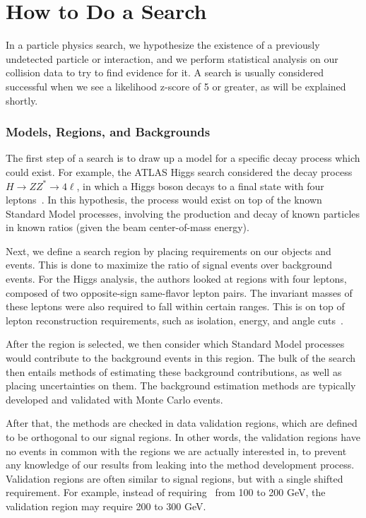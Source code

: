\chapter{How to Do a Search}

In a particle physics search, we hypothesize the existence of a previously undetected particle or interaction, and we perform statistical analysis on our collision data to try to find evidence for it. A search is usually considered successful when we see a likelihood z-score of 5 or greater, as will be explained shortly.

\subsection*{Models, Regions, and Backgrounds}

The first step of a search is to draw up a model for a specific decay process which could exist. For example, the ATLAS Higgs search considered the decay process $H\rightarrow ZZ^*\rightarrow 4\ell$, in which a Higgs boson decays to a final state with four leptons~\cite{HiggsATLAS}. In this hypothesis, the process would exist on top of the known Standard Model processes, involving the production and decay of known particles in known ratios (given the beam center-of-mass energy).

Next, we define a search region by placing requirements on our objects and events. This is done to maximize the ratio of signal events over background events. For the Higgs analysis, the authors looked at regions with four leptons, composed of two opposite-sign same-flavor lepton pairs. The invariant masses of these leptons were also required to fall within certain ranges. This is on top of lepton reconstruction requirements, such as isolation, energy, and angle cuts~\cite{HiggsATLAS}.

After the region is selected, we then consider which Standard Model processes would contribute to the background events in this region. The bulk of the search then entails methods of estimating these background contributions, as well as placing uncertainties on them. The background estimation methods are typically developed and validated with Monte Carlo events.

After that, the methods are checked in data validation regions, which are defined to be orthogonal to our signal regions. In other words, the validation regions have no events in common with the regions we are actually interested in, to prevent any knowledge of our results from leaking into the method development process. Validation regions are often similar to signal regions, but with a single shifted requirement. For example, instead of requiring \MET\ from 100 to 200 GeV, the validation region may require 200 to 300 GeV.

